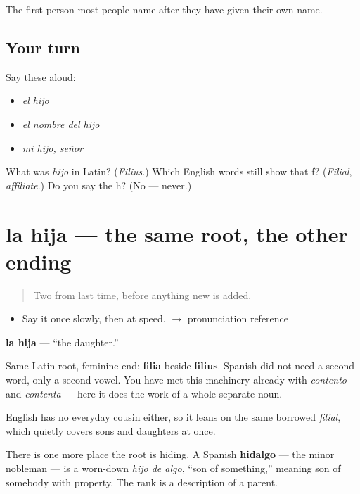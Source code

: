 \begin{grammarlens}[title={What you've built}]
The first person most people name after they have given their own name.
\end{grammarlens}

\subsection*{Your turn}
Say these aloud:

\begin{itemize}
\raggedright
  \item \emph{el hijo}
  \item \emph{el nombre del hijo}
  \item \emph{mi hijo, señor}
\end{itemize}

\begin{tcolorbox}[breakable,colback=teal!4,colframe=teal!35!black,title={Before you move on}]
What was \emph{hijo} in Latin? (\emph{Filius}.) Which English words still show that f? (\emph{Filial}, \emph{affiliate}.) Do you say the h? (No --- never.)
\end{tcolorbox}
\section[la hija]{la hija --- the same root, the other ending}

\label{lesson:ES-C306-hija}



\begin{quote}
Two from last time, before anything new is added.
\end{quote}

\begin{sounds}
\begin{itemize}
\raggedright
  \item Say it once slowly, then at speed. $\to$ pronunciation reference
\end{itemize}
\end{sounds}

\begin{cousinweb}
\textbf{la hija} --- \textquotedblleft{}the daughter.\textquotedblright{}

Same Latin root, feminine end: \textbf{filia} beside \textbf{filius}. Spanish did not need a second word, only a second vowel. You have met this machinery already with \emph{contento} and \emph{contenta} --- here it does the work of a whole separate noun.

English has no everyday cousin either, so it leans on the same borrowed \emph{filial}, which quietly covers sons and daughters at once.

There is one more place the root is hiding. A Spanish \textbf{hidalgo} --- the minor nobleman --- is a worn-down \emph{hijo de algo}, \textquotedblleft{}son of something,\textquotedblright{} meaning son of somebody with property. The rank is a description of a parent.
\end{cousinweb}

